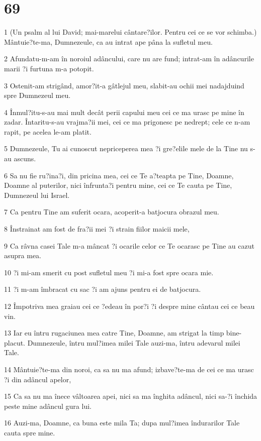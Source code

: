 \chapter{69}

\par 1 (Un psalm al lui David; mai-marelui cântare?ilor. Pentru cei ce se vor schimba.) Mântuie?te-ma, Dumnezeule, ca au intrat ape pâna la sufletul meu.
\par 2 Afundatu-m-am în noroiul adâncului, care nu are fund; intrat-am în adâncurile marii ?i furtuna m-a potopit.
\par 3 Ostenit-am strigând, amor?it-a gâtlejul meu, slabit-au ochii mei nadajduind spre Dumnezeul meu.
\par 4 Înmul?itu-s-au mai mult decât perii capului meu cei ce ma urasc pe mine în zadar. Întaritu-s-au vrajma?ii mei, cei ce ma prigonesc pe nedrept; cele ce n-am rapit, pe acelea le-am platit.
\par 5 Dumnezeule, Tu ai cunoscut nepriceperea mea ?i gre?elile mele de la Tine nu s-au ascuns.
\par 6 Sa nu fie ru?ina?i, din pricina mea, cei ce Te a?teapta pe Tine, Doamne, Doamne al puterilor, nici înfrunta?i pentru mine, cei ce Te cauta pe Tine, Dumnezeul lui Israel.
\par 7 Ca pentru Tine am suferit ocara, acoperit-a batjocura obrazul meu.
\par 8 Înstrainat am fost de fra?ii mei ?i strain fiilor maicii mele,
\par 9 Ca râvna casei Tale m-a mâncat ?i ocarile celor ce Te ocarasc pe Tine au cazut asupra mea.
\par 10 ?i mi-am smerit cu post sufletul meu ?i mi-a fost spre ocara mie.
\par 11 ?i m-am îmbracat cu sac ?i am ajuns pentru ei de batjocura.
\par 12 Împotriva mea graiau cei ce ?edeau în por?i ?i despre mine cântau cei ce beau vin.
\par 13 Iar eu întru rugaciunea mea catre Tine, Doamne, am strigat la timp bine-placut. Dumnezeule, întru mul?imea milei Tale auzi-ma, întru adevarul milei Tale.
\par 14 Mântuie?te-ma din noroi, ca sa nu ma afund; izbave?te-ma de cei ce ma urasc ?i din adâncul apelor,
\par 15 Ca sa nu ma înece vâltoarea apei, nici sa ma înghita adâncul, nici sa-?i închida peste mine adâncul gura lui.
\par 16 Auzi-ma, Doamne, ca buna este mila Ta; dupa mul?imea îndurarilor Tale cauta spre mine.

